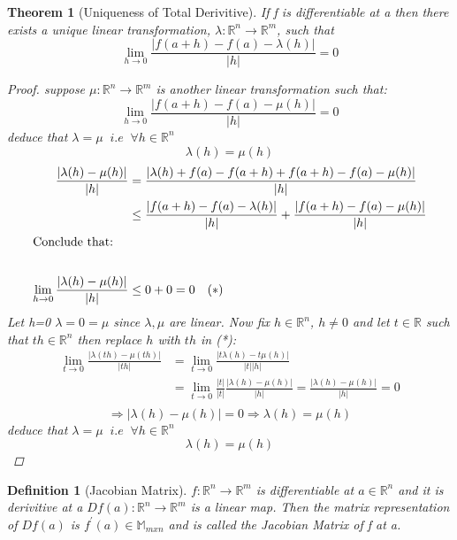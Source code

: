 \documentclass[11pt]{article}
\def\MM{\mathbb{M}}
\def\RR{\mathbb{R}}
\newtheorem{theorem}{Theorem}[section]
\newtheorem{definition}{Definition}[section]
\begin{document}
\begin{theorem}[Uniqueness of Total Derivitive]\label{T:Uniqueness of Total Derivitive}
If f is differentiable at a then there exists a unique linear transformation, $ \lambda:\RR^{n} \rightarrow \RR^{m}$, such that
\[\lim_{h \to 0}\frac{|f(a+h) - f(a) - \lambda(h)|}{|h|} =0 \]
\begin{proof}
suppose $ \mu:\RR^{n} \rightarrow \RR^{m}$ is another linear transformation such that:
\[\lim_{h \to 0}\frac{|f(a+h) - f(a) - \mu(h)|}{|h|} =0 \]
deduce that $\lambda= \mu \;\;  i.e \; \;\forall h\in\RR^{n}$
 \[ \lambda(h)= \mu(h)\]
\begin{align*}
\frac{|\lambda(h)- \mu(h)|}{|h|}&= \frac{|\lambda(h) +f(a) -f(a+h) +f(a+h) -f(a)- \mu(h)|}{|h|}\\
&\leq \frac{|f(a+h) -f(a) -\lambda(h)|}{|h|} +  \frac{|f(a+h) -f(a) -\mu(h)|}{|h|}\\
\shortintertext{Conclude that:} \qquad \qquad \qquad &\\
\lim_{h \to 0}\frac{|\lambda(h)- \mu(h)|}{|h|} &\leq 0 + 0 =0 \quad (*)
\end{align*}
Let h=0 $\lambda= 0=\mu$ since $\lambda, \mu$ are linear. Now fix $h \in \RR^{n}$, $h\neq0$ and let $t\in\RR$ such that $th\in\RR^{n} $ then replace $h$ with $th$ in (*):
\begin{align*}
\lim_{t \to 0}\frac{|\lambda(th)- \mu(th)|}{|th|}&= \lim_{t \to 0}\frac{|t\lambda(h)- t\mu(h)|}{|t||h|}\\
&= \lim_{t \to 0}\frac{|t|}{|t|}\frac{|\lambda(h)- \mu(h)|}{|h|}= \frac{|\lambda(h)- \mu(h)|}{|h|} = 0\\
\end{align*}
\[\Rightarrow |\lambda(h)- \mu(h)|=0 \Rightarrow \lambda(h)= \mu(h)\]
deduce that $\lambda= \mu \;\;  i.e \; \;\forall h\in\RR^{n}$
 \[ \lambda(h)= \mu(h)\]

\end{proof}
\end{theorem}

\begin{definition}[Jacobian Matrix]\label{D:Jacobian Matrix}
$f:\RR^{n} \rightarrow \RR^{m}$ is differentiable at $a \in \RR^{n}$ and it is derivitive at a $Df(a):\RR^{n} \rightarrow \RR^{m}$ is a linear map. Then the matrix representation of $Df(a)$ is $f^{'}(a) \in \MM_{mxn}$ and is called the Jacobian Matrix of f at a.
\end{definition}
\end{document}
